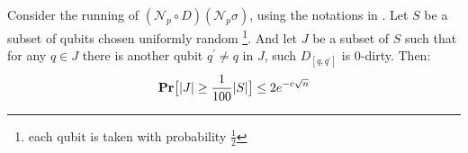   \begin{claim}
    \label{claim:no_intersect}
    Consider the running of $\left( \mathcal{N}_{p} \circ D \right)   \left( \mathcal{N}_{p} \sigma \right)$, using the notations in . Let $S$ be a subset of qubits chosen uniformly random \footnote{each qubit is taken with probability $\frac{1}{2}$}. And let $J$ be a subset of $S$ such that for any $q \in J$ there is another qubit $q^{\prime}\neq q$ in $J$, such $D_{[q,q^{\prime}]}$ is $0$-dirty. Then:
    \begin{equation*}
      \begin{split}
        \mathbf{Pr} \big[ |J| \ge \frac{1}{100} |S| \big] \le 2e^{-c\sqrt{n}}
      \end{split}
    \end{equation*}

  \end{claim}



